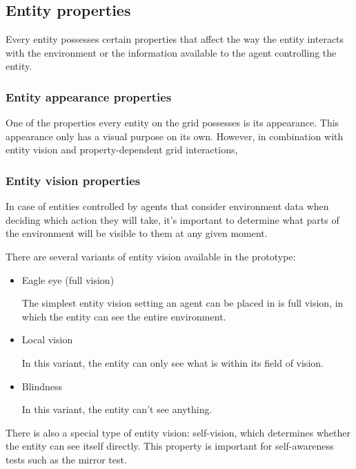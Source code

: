 \documentclass[masterthesis]{fer}
\begin{document}
\subsection{Entity properties}

Every entity possesses certain properties that affect the way the entity interacts with the environment or the information available to the agent controlling the entity.

\subsubsection{Entity appearance properties}

One of the properties every entity on the grid possesses is its appearance. This appearance only has a visual purpose on its own.
However, in combination with entity vision and property-dependent grid interactions, 

\subsubsection{Entity vision properties}

In case of entities controlled by agents that consider environment data
when deciding which action they will take, it's important to determine what parts of the environment will be visible to them at any given moment.

There are several variants of entity vision available in the prototype:

\begin{itemize}
\item{Eagle eye (full vision)}

The simplest entity vision setting an agent can be placed in is full vision, in which the entity can see the entire environment.

\item{Local vision}

In this variant, the entity can only see what is within its field of vision.

\item{Blindness}

In this variant, the entity can't see anything.

\end{itemize}

There is also a special type of entity vision: self-vision, which determines whether the entity can see itself directly.
This property is important for self-awareness tests such as the mirror test.
\end{document}
